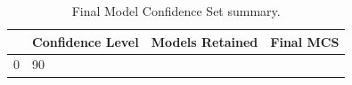 \begin{table}
\caption{Final Model Confidence Set summary.}
\label{tab:mcs_summary}
\begin{tabular}{llrl}
\toprule
 & Confidence Level & Models Retained & Final MCS \\
\midrule
0 & 90%
\bottomrule
\end{tabular}
\end{table}
